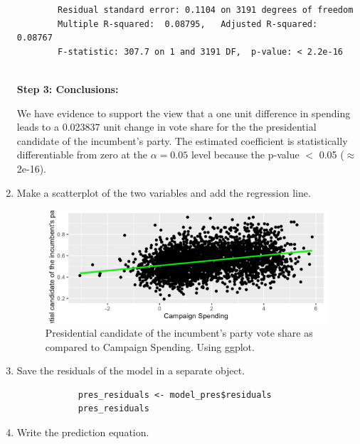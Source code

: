 \documentclass[12pt,letterpaper]{article}
\begin{document}
\begin{enumerate}
\begin{verbatim}
		Residual standard error: 0.1104 on 3191 degrees of freedom
		Multiple R-squared:  0.08795,	Adjusted R-squared:  0.08767 
		F-statistic: 307.7 on 1 and 3191 DF,  p-value: < 2.2e-16
	
		\end{verbatim}
		
		\textbf{Step 3: Conclusions:}
		
		We have evidence to support the view that a one unit difference in spending leads to a 0.023837 unit change in vote share for the the presidential candidate of the incumbent's party. The estimated coefficient is statistically differentiable from zero at the $\alpha=0.05$ level because the p-value $<$ 0.05 ($\approx $2e-16). \\
		
		
		\item Make a scatterplot of the two variables and add the regression line. 	
		
		  
		
		\begin{figure}[h!]
			\centering
			\caption{\footnotesize Presidential candidate of the incumbent's party vote share as compared to Campaign Spending. Using ggplot.}
			\includegraphics[width=0.99\textwidth]{vote_share_pres_scatter.png}
			
		\end{figure} 
				
		\newpage
		
		\item Save the residuals of the model in a separate object.	
		
		\begin{verbatim}
			pres_residuals <- model_pres$residuals
			pres_residuals
		\end{verbatim}
		
		
		\item Write the prediction equation.
		
		\end{enumerate}		
		
\end{document}
